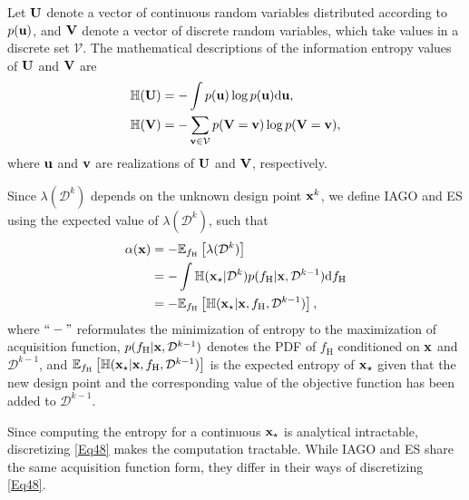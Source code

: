 \documentclass[iicol,sn-basic]{sn-jnl}%
\begin{document}
Let ${\bf U}$ denote a vector of continuous random variables distributed according to $p({\bf u})$, and ${\bf V}$ denote a vector of discrete random variables, which take values in a discrete set $\mathcal{V}$.
The mathematical descriptions of the information entropy values of ${\bf U}$ and ${\bf V}$ are 
\begin{subequations}\label{Eq47}
	\begin{align}
		\mathbb{H}({\bf U})& =-\int p({\bf u}) \log{p({\bf u})} \text{d}{\bf u}
		\label{Eq47-1},\\
		\mathbb{H}({\bf V}) & = -\sum_{{\bf v} \in \mathcal{V}}p({\bf V}={\bf v}) \log{p({\bf V}={\bf v})}
		\label{Eq47-2},
	\end{align}
\end{subequations}
where ${\bf u}$ and ${\bf v}$ are realizations of ${\bf U}$ and ${\bf V}$, respectively.

Since $\lambda(\mathcal{D}^{k})$ depends on the unknown design point ${\bf x}^k$, we define IAGO and ES using the expected value of $\lambda(\mathcal{D}^{k})$, such that
\begin{equation}\label{Eq48}
	\begin{aligned}
		\alpha({\bf x}) & = -\mathbb{E}_{f_\text{H}}\left[\lambda(\mathcal{D}^{k})\right]\\
		& = -\int \mathbb{H}({\bf x}_\star|\mathcal{D}^{k})  p(f_\text{H}|{\bf x},\mathcal{D}^{k-1}) \text{d}f_\text{H}\\
		& = -\mathbb{E}_{f_\text{H}}\left[\mathbb{H}({\bf x}_\star|{\bf x},f_\text{H},\mathcal{D}^{k-1})\right],
	\end{aligned}
\end{equation}
where $``-"$ reformulates the minimization of entropy to the maximization of acquisition function, $p(f_\text{H}|{\bf x},\mathcal{D}^{k-1})$ denotes the PDF of $f_\text{H}$ conditioned on $\bf x$ and $\mathcal{D}^{k-1}$, and $\mathbb{E}_{f_\text{H}}\left[\mathbb{H}({\bf x}_\star|{\bf x},f_\text{H},\mathcal{D}^{k-1})\right]$ is the expected entropy of ${\bf x}_\star$ given that the new design point and the corresponding value of the objective function has been added to $\mathcal{D}^{k-1}$.

Since computing the entropy for a continuous ${\bf x}_\star$ is analytical intractable, discretizing \cref{Eq48} makes the computation tractable.
While IAGO and ES share the same acquisition function form, they differ in their ways of discretizing \cref{Eq48}.
\end{document}
